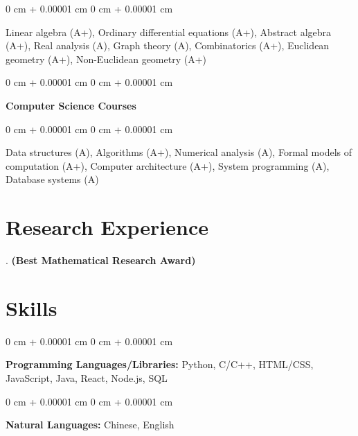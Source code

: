 \documentclass[11pt, letterpaper]{article}
\newenvironment{onecolentry}{
    \begin{adjustwidth}{
        0 cm + 0.00001 cm
    }{
        0 cm + 0.00001 cm
    }
}{
    \end{adjustwidth}
} %
\begin{document}
    \vspace{0.10 cm}
    \begin{onecolentry}
    Linear algebra (A+), Ordinary differential equations (A+), Abstract algebra (A+), Real analysis (A), Graph theory (A), Combinatorics (A+), Euclidean geometry (A+), Non-Euclidean geometry (A+)
    \end{onecolentry}

    \vspace{0.20 cm}

    \begin{onecolentry}
        \textbf{Computer Science Courses}
    \end{onecolentry}

    \vspace{0.10 cm}
    \begin{onecolentry}
        Data structures (A), Algorithms (A+), Numerical analysis (A), Formal models of computation (A+), Computer architecture (A+), System programming (A), Database systems (A)
    \end{onecolentry}


\section{Research Experience}

    \vspace{0.20 cm}

    . \textbf{(Best Mathematical Research Award)}


\section{Skills}
    \begin{onecolentry}
        \textbf{Programming Languages/Libraries:} Python, C/C++, HTML/CSS, JavaScript, Java, React, Node.js, SQL
    \end{onecolentry}

    \vspace{0.2 cm}

    \begin{onecolentry}
        \textbf{Natural Languages:} Chinese, English
    \end{onecolentry}
\end{document}
